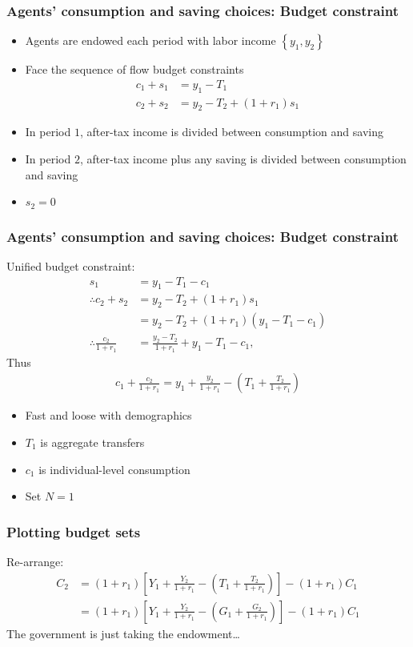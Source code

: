 \documentclass[presentation,dvipsnames]{beamer}
\begin{document}
\begin{frame}
\frametitle{Agents' consumption and saving choices: Budget constraint}
\begin{itemize}[label={--}]
\item Agents are endowed each period with labor income $\left\{ y_{1},y_{2} \right\}$
\item Face the sequence of flow budget constraints
\begin{align*}
c_{1} + s_{1} &= y_{1} - T_{1} \\
c_{2} + s_{2} &= y_{2} - T_{2} + (1+r_{1})s_{1}
\end{align*}
\item In period $1$, after-tax income is divided between consumption and saving
\item In period $2$, after-tax income plus any saving is divided between consumption and saving
\item $s_{2} = 0$
\end{itemize}
\end{frame}

\begin{frame}
\frametitle{Agents' consumption and saving choices: Budget constraint}
Unified budget constraint:
\begin{align*}
s_{1} &= y_{1} - T_{1} - c_{1} \\
\therefore c_{2} + s_{2} &= y_{2} - T_{2} + (1+r_{1})s_{1} \\
&= y_{2} - T_{2} + (1+r_{1}) \left( y_{1} - T_{1} - c_{1} \right) \\
\therefore \frac{c_{2}}{1+r_{1}} &= \frac{y_{2} - T_{2}}{1+r_{1}} + y_{1} - T_{1} - c_{1},
\end{align*}
Thus
\begin{align*}
c_{1} + \frac{c_{2}}{1+r_{1}} = y_{1} + \frac{y_{2}}{1+r_{1}} - \left( T_{1} + \frac{T_{2}}{1+r_{1}} \right)
\end{align*}
\begin{itemize}[label={--}]
\item Fast and loose with demographics
\item $T_{1}$ is aggregate transfers
\item $c_{1}$ is individual-level consumption
\item Set $N = 1$
\end{itemize}
\end{frame}

\begin{frame}
\frametitle{Plotting budget sets}
Re-arrange:
\begin{align*}
C_{2} &= (1+r_{1})\left[ Y_{1} + \frac{Y_{2}}{1+r_{1}} - \left( T_{1} + \frac{T_{2}}{1+r_{1}} \right) \right] - (1+r_{1})C_{1} \\
&= (1+r_{1})\left[ Y_{1} + \frac{Y_{2}}{1+r_{1}} - \left( G_{1} + \frac{G_{2}}{1+r_{1}} \right) \right] - (1+r_{1})C_{1}
\end{align*}
The government is just taking the endowment\dots
\end{frame}
\end{document}
